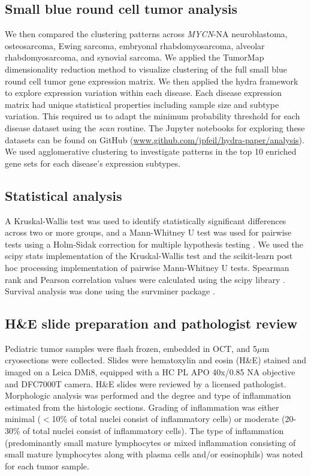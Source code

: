 \documentclass[10pt,letterpaper]{article}
\begin{document}
\subsection*{Small blue round cell tumor analysis}
We then compared the clustering patterns across \textit{MYCN}-NA neuroblastoma, osteosarcoma, Ewing sarcoma, embryonal rhabdomyosarcoma, alveolar rhabdomyosarcoma, and synovial sarcoma. We applied the TumorMap dimensionality reduction method \cite{newtonTumorMapExploringMolecular2017} to visualize clustering of the full small blue round cell tumor gene expression matrix. We then applied the hydra framework to explore expression variation within each disease. Each disease expression matrix had unique statistical properties including sample size and subtype variation. This required us to adapt the minimum probability threshold for each disease dataset using the \textit{scan} routine. The Jupyter notebooks for exploring these datasets can be found on GitHub (\url{www.github.com/jpfeil/hydra-paper/analysis}). We used agglomerative clustering to investigate patterns in the top 10 enriched gene sets for each disease's expression subtypes.

\subsection*{Statistical analysis}
A Kruskal-Wallis test was used to identify statistically significant differences across two or more groups, and a Mann-Whitney U test was used for pairwise tests using a Holm-Sidak correction for multiple hypothesis testing \cite{pedregosa2011scikit,jonesSciPyOpenSource2001}. We used the scipy \cite{2019arXiv190710121V} stats implementation of the Kruskal-Wallis test and the scikit-learn post hoc processing \cite{Terpilowski2019} implementation of pairwise Mann-Whitney U tests. Spearman rank and Pearson correlation values were calculated using the scipy library \cite{jonesSciPyOpenSource2001}. Survival analysis was done using the survminer package \cite{kassambaraSurvminerDrawingSurvival2019}.

\subsection*{H\&E slide preparation and pathologist review}
Pediatric tumor samples were flash frozen, embedded in OCT, and 5$\mu$m cryosections were collected. Slides were hematoxylin and eosin (H\&E) stained and imaged on a Leica DMi8, equipped with a HC PL APO 40x/0.85 NA objective and DFC7000T camera. H\&E slides were reviewed by a licensed pathologist.  Morphologic analysis was performed and the degree and type of inflammation estimated from the histologic sections. Grading of inflammation was either minimal ($<$10\% of total nuclei consist of inflammatory cells) or  moderate (20-30\% of total nuclei consist of inflammatory cells). The type of inflammation (predominantly small mature lymphocytes or mixed inflammation consisting of small mature lymphocytes along with plasma cells and/or eosinophils) was noted for each tumor sample.
\end{document}
